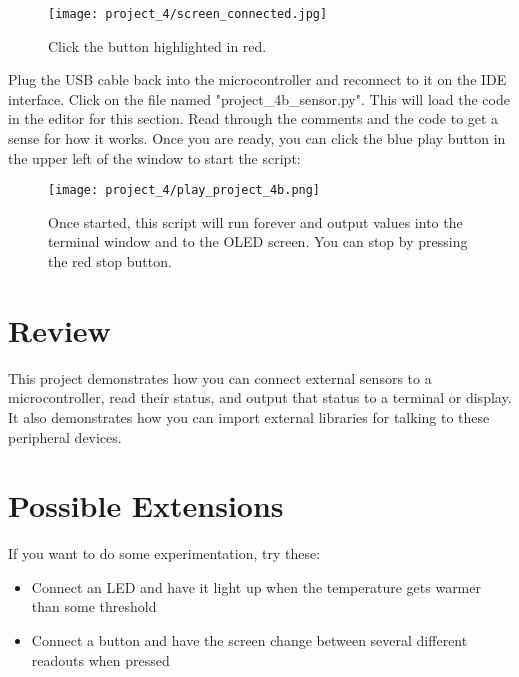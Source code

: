\begin{figure}[H]
    \centering
    \texttt{[image: project\_4/screen\_connected.jpg]}
    \caption{Click the button highlighted in red.}
\end{figure}

Plug the USB cable back into the microcontroller and reconnect to it on the IDE interface.
Click on the file named "project\_4b\_sensor.py". This will load the code in the editor for this section. Read through the comments and
the code to get a sense for how it works. Once you are ready, you can click the blue play button in the upper left of the window to start the script:

\begin{figure}[H]
    \centering
    \texttt{[image: project\_4/play\_project\_4b.png]}
    \caption{Once started, this script will run forever and output values into the terminal window and to the OLED screen.
    You can stop by pressing the red stop button.}
\end{figure}

\section{Review}
This project demonstrates how you can connect external sensors to a microcontroller, read their status,
and output that status to a terminal or display. It also demonstrates how you can import external libraries
for talking to these peripheral devices.

\section{Possible Extensions}
If you want to do some experimentation, try these:

\begin{itemize}
    \item Connect an LED and have it light up when the temperature gets warmer than some threshold
    \item Connect a button and have the screen change between several different readouts when pressed
\end{itemize}
